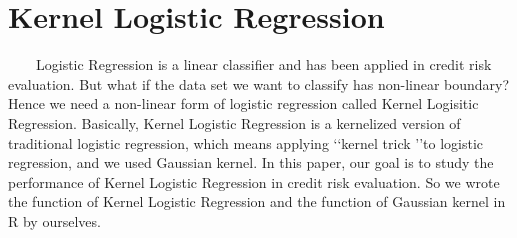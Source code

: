 \documentclass[11pt, oneside]{article}   	%
\begin{document}
\section{Kernel Logistic Regression}
~~~~Logistic Regression is a linear classifier and has been applied in credit risk evaluation. But what if the data set we want to  classify has non-linear boundary? Hence we need a non-linear form of logistic regression called Kernel Logisitic Regression. Basically, Kernel Logistic Regression is a kernelized version of traditional logistic regression, which means applying \lq\lq kernel trick \rq\rq to logistic regression, and we used Gaussian kernel. In this paper, our goal is to study the performance of Kernel Logistic Regression in credit risk evaluation. So we wrote the function of Kernel Logistic Regression and  the function of Gaussian kernel in R by ourselves.
\end{document}
